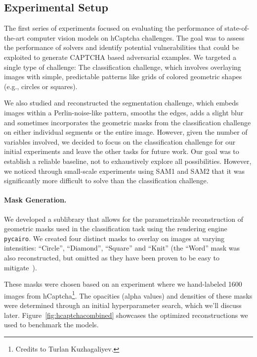 \documentclass[a4paper, oneside]{discothesis}
\begin{document}
\subsection{Experimental Setup}

The first series of experiments focused on evaluating the performance of state-of-the-art computer vision models on hCaptcha challenges. The goal was to assess the performance of solvers and identify potential vulnerabilities that could be exploited to generate CAPTCHA based adversarial examples. We targeted a single type of challenge: The classification challenge, which involves overlaying images with simple, predictable patterns like grids of colored geometric shapes (e.g., circles or squares).

We also studied and reconstructed the segmentation challenge, which embeds images within a Perlin-noise-like pattern, smooths the edges, adds a slight blur and sometimes incorporates the geometric masks from the classification challenge on either individual segments or the entire image. However, given the number of variables involved, we decided to focus on the classification challenge for our initial experiments and leave the other tasks for future work. Our goal was to establish a reliable baseline, not to exhaustively explore all possibilities. However, we noticed through small-scale experiments using SAM1 and SAM2 that it was significantly more difficult to solve than the classification challenge.

\paragraph{Mask Generation.}

We developed a sublibrary that allows for the parametrizable reconstruction of geometric masks used in the classification task using the rendering engine \texttt{pycairo}. We created four distinct masks to overlay on images at varying intensities: ``Circle'', ``Diamond'', ``Square'' and ``Knit'' (the ``Word'' mask was also reconstructed, but omitted as they have been proven to be easy to mitigate~\cite{zhang2023text,dong2023robust,shayegani2023plug}).

These masks were chosen based on an experiment where we hand-labeled 1600 images from hCaptcha\footnote{Credits to Turlan Kuzhagaliyev.}. The opacities (alpha values) and densities of these masks were determined through an initial hyperparameter search, which we'll discuss later. Figure~\ref{fig:hcaptchacombined} showcases the optimized reconstructions we used to benchmark the models.
\end{document}
